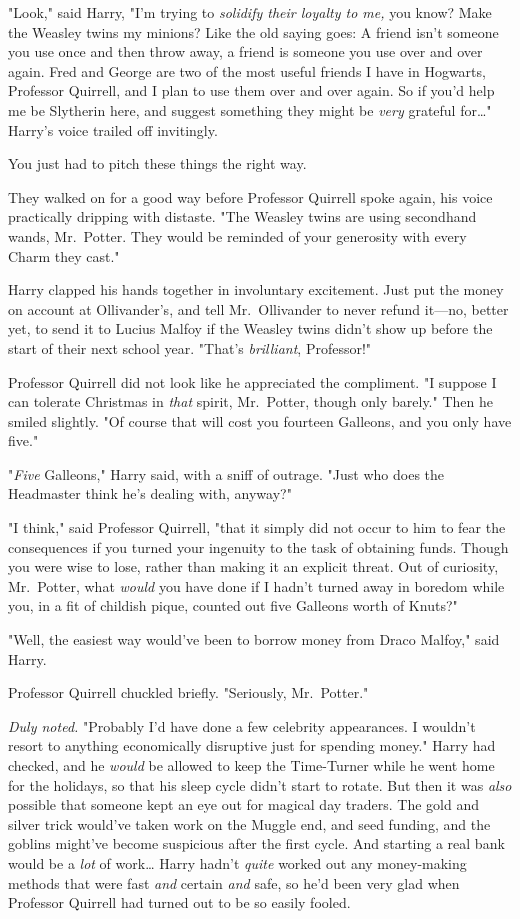 "Look," said Harry, "I'm trying to \emph{solidify their loyalty to me,} you
know? Make the Weasley twins my minions? Like the old saying goes: A friend
isn't someone you use once and then throw away, a friend is someone you use
over and over again. Fred and George are two of the most useful friends I have
in Hogwarts, Professor Quirrell, and I plan to use them over and over again. So
if you'd help me be Slytherin here, and suggest something they might be
\emph{very} grateful for{\ldots}" Harry's voice trailed off invitingly.

You just had to pitch these things the right way.

They walked on for a good way before Professor Quirrell spoke again, his voice
practically dripping with distaste. "The Weasley twins are using secondhand
wands, Mr.~Potter. They would be reminded of your generosity with every Charm
they cast."

Harry clapped his hands together in involuntary excitement. Just put the money
on account at Ollivander's, and tell Mr.~Ollivander to never refund it---no,
better yet, to send it to Lucius Malfoy if the Weasley twins didn't show up
before the start of their next school year. "That's \emph{brilliant},
Professor!"

Professor Quirrell did not look like he appreciated the compliment. "I suppose
I can tolerate Christmas in \emph{that} spirit, Mr.~Potter, though only
barely." Then he smiled slightly. "Of course that will cost you fourteen
Galleons, and you only have five."

"\emph{Five} Galleons," Harry said, with a sniff of outrage. "Just who does the
Headmaster think he's dealing with, anyway?"

"I think," said Professor Quirrell, "that it simply did not occur to him to
fear the consequences if you turned your ingenuity to the task of obtaining
funds. Though you were wise to lose, rather than making it an explicit threat.
Out of curiosity, Mr.~Potter, what \emph{would} you have done if I hadn't
turned away in boredom while you, in a fit of childish pique, counted out five
Galleons worth of Knuts?"

"Well, the easiest way would've been to borrow money from Draco Malfoy," said
Harry.

Professor Quirrell chuckled briefly. "Seriously, Mr.~Potter."

\emph{Duly noted.} "Probably I'd have done a few celebrity appearances. I
wouldn't resort to anything economically disruptive just for spending money."
Harry had checked, and he \emph{would} be allowed to keep the Time-Turner while
he went home for the holidays, so that his sleep cycle didn't start to rotate.
But then it was \emph{also} possible that someone kept an eye out for magical
day traders. The gold and silver trick would've taken work on the Muggle end,
and seed funding, and the goblins might've become suspicious after the first
cycle. And starting a real bank would be a \emph{lot} of work{\ldots} Harry
hadn't \emph{quite} worked out any money-making methods that were fast
\emph{and} certain \emph{and} safe, so he'd been very glad when Professor
Quirrell had turned out to be so easily fooled.

